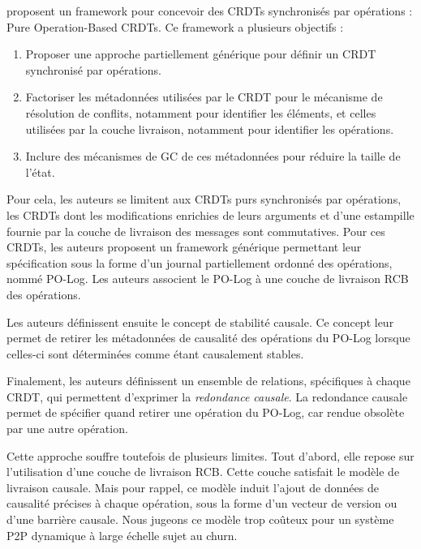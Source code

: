 \textcite{baquero2017pure} proposent un framework pour concevoir des \acp{CRDT} synchronisés par opérations : Pure Operation-Based \acp{CRDT}.
Ce framework a plusieurs objectifs :
\begin{enumerate}
    \item Proposer une approche partiellement générique pour définir un \ac{CRDT} synchronisé par opérations.
    \item Factoriser les métadonnées utilisées par le \ac{CRDT} pour le mécanisme de résolution de conflits, notamment pour identifier les éléments, et celles utilisées par la couche livraison, notamment pour identifier les opérations.
    \item Inclure des mécanismes de \ac{GC} de ces métadonnées pour réduire la taille de l'état.
\end{enumerate}

Pour cela, les auteurs se limitent aux \acp{CRDT} purs synchronisés par opérations, \ie les \acp{CRDT} dont les modifications enrichies de leurs arguments et d'une estampille fournie par la couche de livraison des messages sont commutatives.
Pour ces \acp{CRDT}, les auteurs proposent un framework générique permettant leur spécification sous la forme d'un journal partiellement ordonné des opérations, nommé PO-Log.
Les auteurs associent le PO-Log à une couche de livraison \ac{RCB} des opérations.

Les auteurs définissent ensuite le concept de stabilité causale.
Ce concept leur permet de retirer les métadonnées de causalité des opérations du PO-Log lorsque celles-ci sont déterminées comme étant causalement stables.

Finalement, les auteurs définissent un ensemble de relations, spécifiques à chaque \ac{CRDT}, qui permettent d'exprimer la \emph{redondance causale}.
La redondance causale permet de spécifier quand retirer une opération du PO-Log, car rendue obsolète par une autre opération.

Cette approche souffre toutefois de plusieurs limites.
Tout d'abord, elle repose sur l'utilisation d'une couche de livraison \ac{RCB}.
Cette couche satisfait le modèle de livraison causale.
Mais pour rappel, ce modèle induit l'ajout de données de causalité précises à chaque opération, sous la forme d'un vecteur de version ou d'une barrière causale.
Nous jugeons ce modèle trop coûteux pour un système \ac{P2P} dynamique à large échelle sujet au churn.

